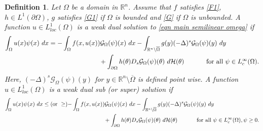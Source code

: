 \documentclass{amsart}
\newtheorem{definition}[theorem]{Definition}
\newcommand{\R}{\mathbb{R}}
\newcommand{\slap}{(-\Delta)^{s}}
\newcommand{\rn}{\mathbb{R}^{n}}
\newcommand{\g}[1]{\mathcal{G}_{#1}}
\newcommand{\Ds}{D_{s}}
\begin{document}
 \begin{definition}\label{dfn weak dual for semilinear}
     Let $\Omega$ be a domain in $\rn$. Assume that $f$ satisfies \ref{F1}, $h\in L^{1}(\partial\Omega)$, $g$ satisfies \ref{G1} if $\Omega$ is bounded and \ref{G} if $\Omega$ is unbounded. A function $u\in L_{loc}^{1}(\Omega)$ is a weak dual solution to \eqref{eqn main semilinear omega}
  if 
 \begin{equation*}
 \begin{split}
     \int_{\Omega}u(x)\psi(x)\ dx=-& \int_{\Omega}f(x,u(x)) \g{\Omega}(\psi)(x)\ dx-\int_{\R^{n}\setminus\overline{\Omega}}g(y) \slap \g{\Omega}(\psi)(y)\ dy\\
      &\hspace{2cm}+\int_{\partial\Omega}h(\theta)\Ds \g{\Omega}(\psi)(\theta) \ d\mathcal{H}(\theta) \hspace{1.2cm}  \text{for all }\psi\in L_{c}^{\infty}(\Omega).
     \end{split}
 \end{equation*}
 Here, $\slap \g{\Omega}(\psi)(y)$ for $y\in \R^{n}\setminus\overline{\Omega}$ is defined point wise. A function $u\in L^{1}_{loc}(\Omega)$ is a weak dual sub (or super) solution if 
 \begin{equation*}
 \begin{split}
     \int_{\Omega}u(x)\psi(x)\ dx\leq (\text{or } \geq) -&\int_{\Omega}f(x,u(x)) \g{\Omega}(\psi)(x)\ dx-\int_{\R^{n}\setminus\overline{\Omega}}g(y) \slap \g{\Omega}(\psi)(y)\ dy \\
     &\hspace{2cm} +\int_{\partial\Omega}h(\theta)\Ds \g{\Omega}(\psi)(\theta) \ d\mathcal{H}(\theta) \hspace{1.2cm} \text{for all }\psi\in L_{c}^{\infty}(\Omega), \psi\geq 0.
      \end{split}
 \end{equation*}
 
 \end{definition}
\end{document}
